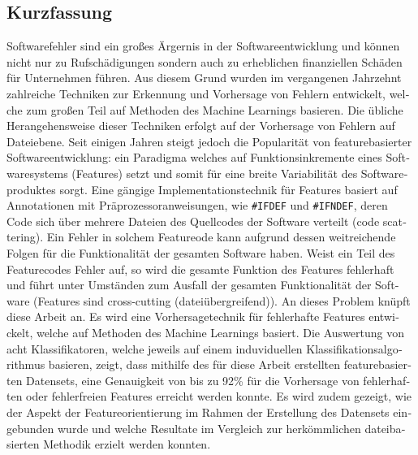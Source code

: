 
\begin{otherlanguage}{ngerman}
    \section*{Kurzfassung}

Softwarefehler sind ein großes Ärgernis in der Softwareentwicklung und können nicht nur zu Rufschädigungen sondern auch zu erheblichen finanziellen Schäden für Unternehmen führen. Aus diesem Grund wurden im vergangenen Jahrzehnt zahlreiche Techniken zur Erkennung und Vorhersage von Fehlern entwickelt, welche zum großen Teil auf Methoden des Machine Learnings basieren. Die übliche Herangehensweise dieser Techniken erfolgt auf der Vorhersage von Fehlern auf Dateiebene. Seit einigen Jahren steigt jedoch die Popularität von featurebasierter Softwareentwicklung: ein Paradigma welches auf Funktionsinkremente eines Softwaresystems (Features) setzt und somit für eine breite Variabilität des Softwareproduktes sorgt. Eine gängige Implementationstechnik für Features basiert auf Annotationen mit Präprozessoranweisungen, wie \texttt{\#IFDEF} und \texttt{\#IFNDEF}, deren Code sich über mehrere Dateien des Quellcodes der Software verteilt (\glqq code scattering\grqq). Ein Fehler in solchem Featureode kann aufgrund dessen weitreichende Folgen für die Funktionalität der gesamten Software haben. Weist ein Teil des Featurecodes Fehler auf, so wird die gesamte Funktion des Features fehlerhaft und führt unter Umständen zum Ausfall der gesamten Funktionalität der Software (Features sind \glqq cross-cutting\grqq{} (dateiübergreifend)). An dieses Problem knüpft diese Arbeit an. Es wird eine Vorhersagetechnik für fehlerhafte Features entwickelt, welche auf Methoden des Machine Learnings basiert. Die Auswertung von acht Klassifikatoren, welche jeweils auf einem induviduellen Klassifikationsalgorithmus basieren, zeigt, dass mithilfe des für diese Arbeit erstellten featurebasierten Datensets, eine Genauigkeit von bis zu 92\% für die Vorhersage von fehlerhaften oder fehlerfreien Features erreicht werden konnte. Es wird zudem gezeigt, wie der Aspekt der Featureorientierung im Rahmen der Erstellung des Datensets eingebunden wurde und welche Resultate im Vergleich zur herkömmlichen dateibasierten Methodik erzielt werden konnten.

\end{otherlanguage}

